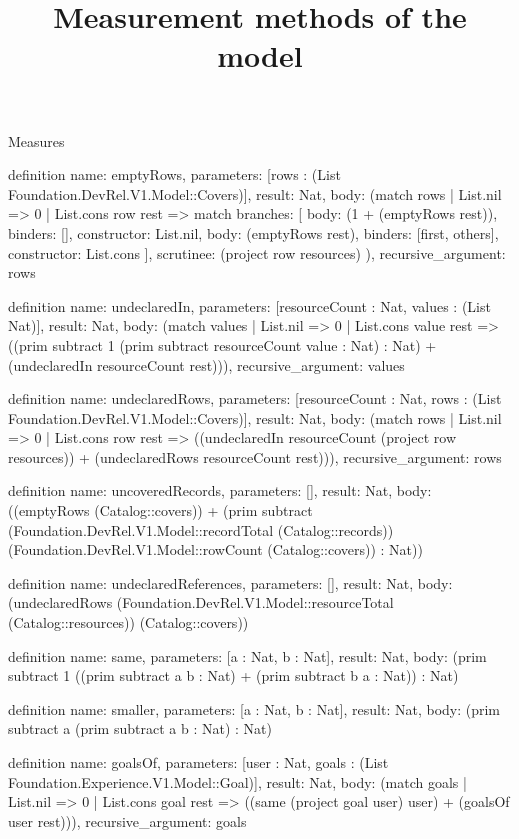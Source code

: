 \begin{lexlean}{Measures}
\title{Measurement methods of the model}
\begin{semanticmodule}
definition{
  name: emptyRows,
  parameters: [rows : (List Foundation.DevRel.V1.Model::Covers)],
  result: Nat,
  body: (match rows
    | List.nil => 0
    | List.cons row rest => match{
      branches: [
        {body: (1 + (emptyRows rest)), binders: [], constructor: List.nil},
        {body: (emptyRows rest), binders: [first, others], constructor: List.cons}
      ],
      scrutinee: (project row resources)
    }),
  recursive_argument: rows
}

definition{
  name: undeclaredIn,
  parameters: [resourceCount : Nat, values : (List Nat)],
  result: Nat,
  body: (match values
    | List.nil => 0
    | List.cons value rest => ((prim subtract 1 (prim subtract resourceCount value : Nat) : Nat) + (undeclaredIn resourceCount rest))),
  recursive_argument: values
}

definition{
  name: undeclaredRows,
  parameters: [resourceCount : Nat, rows : (List Foundation.DevRel.V1.Model::Covers)],
  result: Nat,
  body: (match rows
    | List.nil => 0
    | List.cons row rest => ((undeclaredIn resourceCount (project row resources)) + (undeclaredRows resourceCount rest))),
  recursive_argument: rows
}

definition{
  name: uncoveredRecords,
  parameters: [],
  result: Nat,
  body: ((emptyRows (Catalog::covers)) + (prim subtract (Foundation.DevRel.V1.Model::recordTotal (Catalog::records)) (Foundation.DevRel.V1.Model::rowCount (Catalog::covers)) : Nat))
}

definition{
  name: undeclaredReferences,
  parameters: [],
  result: Nat,
  body: (undeclaredRows (Foundation.DevRel.V1.Model::resourceTotal (Catalog::resources)) (Catalog::covers))
}

definition{
  name: same,
  parameters: [a : Nat, b : Nat],
  result: Nat,
  body: (prim subtract 1 ((prim subtract a b : Nat) + (prim subtract b a : Nat)) : Nat)
}

definition{
  name: smaller,
  parameters: [a : Nat, b : Nat],
  result: Nat,
  body: (prim subtract a (prim subtract a b : Nat) : Nat)
}

definition{
  name: goalsOf,
  parameters: [user : Nat, goals : (List Foundation.Experience.V1.Model::Goal)],
  result: Nat,
  body: (match goals
    | List.nil => 0
    | List.cons goal rest => ((same (project goal user) user) + (goalsOf user rest))),
  recursive_argument: goals
}


\end{semanticmodule}
\end{lexlean}
